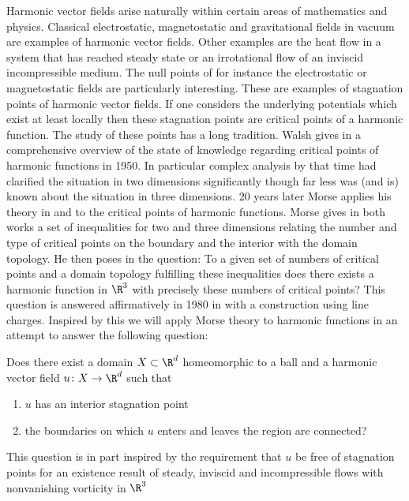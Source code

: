Harmonic vector fields arise naturally within certain areas of mathematics and physics.
Classical electrostatic, magnetostatic and gravitational fields in vacuum are examples of harmonic vector fields.
Other examples are the heat flow in a system that has reached steady state or
an irrotational flow of an inviscid incompressible medium.
The null points of for instance the electrostatic or magnetostatic fields
are particularly interesting.
These are examples of stagnation points of harmonic vector fields.
If one considers the underlying potentials which exist at least locally then these stagnation points
are critical points of a harmonic function.
The study of these points has a long tradition.
Walsh gives in \cite{Walsh1950} a comprehensive overview of the state of knowledge regarding 
critical points of harmonic functions in 1950.
In particular complex analysis by that time had clarified the situation in two dimensions
significantly though far less was (and is) known about the situation in three dimensions.
20 years later Morse applies his theory in \cite{Morse1969} and \cite{Morse1970}
to the critical points of harmonic functions.
Morse gives in both works a set of inequalities for two and three dimensions relating the number and type of critical points on the
boundary and the interior with the domain topology.
He then poses in \cite{Morse1970} the question: To a given
set of numbers of critical points and a domain topology fulfilling these inequalities does there exists a
harmonic function in $\R^3$ with precisely these numbers of critical points?
This question is answered affirmatively in 1980 in \cite{Shelton1980} with a 
construction using line charges. 
Inspired by this we will apply Morse theory to harmonic functions in an attempt to
answer the following question:
\begin{question}\label{qu:flowthroughStagnationPoint}
  Does there exist a domain $X\subset\R^d$ homeomorphic to a ball and a harmonic vector field $u\colon X\to\R^d$ such that
  \begin{enumerate}
    \item $u$ has an interior stagnation point
    \item the boundaries on which $u$ enters and leaves the region are connected?
  \end{enumerate}
\end{question}
This question is in part inspired by the requirement that $u$ be free of stagnation points for an existence result of steady, inviscid
and incompressible flows with nonvanishing vorticity in $\R^3$
